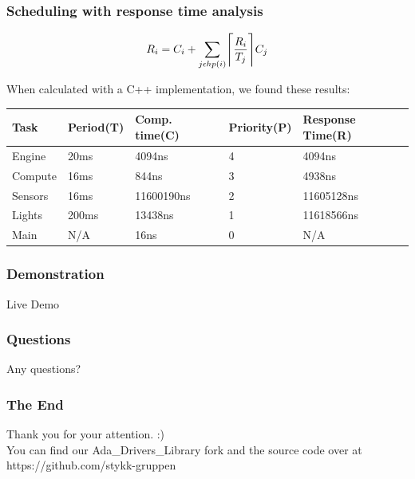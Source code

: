 \documentclass{beamer}
\DeclarePairedDelimiter{\ceil}{\lceil}{\rceil}
\begin{document}
\begin{frame}
    \centering
    \frametitle{Scheduling with response time analysis}
\begin{equation*}
  R_{i} = C_{i} + \sum_{j \epsilon hp(i)} \ceil[\Bigg]{\frac{R_{i}}{T_{j}}} C_{j}
\end{equation*}


When calculated with a C++ implementation, we found these results:


\begin{center}
 \begin{tabular}{||l l l l|l||}
 \hline
   Task & Period(T) & Comp. time(C) & Priority(P) & Response Time(R) \\ [0.5ex]
 \hline\hline
   Engine & 20ms & 4094ns & 4 & 4094ns \\
 \hline
   Compute & 16ms & 844ns & 3 & 4938ns \\
 \hline
   Sensors & 16ms & 11600190ns & 2 & 11605128ns \\
 \hline
   Lights & 200ms & 13438ns & 1 & 11618566ns \\
 \hline
   Main & N/A & 16ns & 0 & N/A \\ [1ex]
 \hline
\end{tabular}
\end{center}

\end{frame}

\begin{frame}
    \centering
    \frametitle{Demonstration}
    Live Demo
\end{frame}

\begin{frame}
    \centering
    \frametitle{Questions}
Any questions?
\end{frame}

\begin{frame}
    \centering
    \frametitle{The End}
    Thank you for your attention. :)\\
    You can find our Ada\_Drivers\_Library fork and the source code over at https://github.com/stykk-gruppen
\end{frame}
\end{document}
